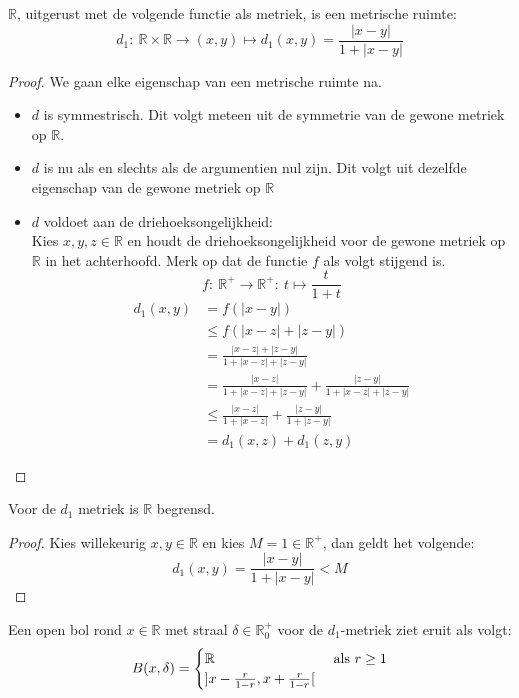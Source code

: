 \documentclass[main.tex]{subfiles}
\begin{document}
\begin{vb}
  $\mathbb{R}$, uitgerust met de volgende functie als metriek, is een metrische ruimte:
  \[ d_{1}:\ \mathbb{R}\times\mathbb{R}\rightarrow (x,y) \mapsto d_{1}(x,y)=\frac{|x-y|}{1+|x-y|} \]
  \begin{proof}
    We gaan elke eigenschap van een metrische ruimte na.
    \begin{itemize}
    \item $d$ is symmestrisch.
      Dit volgt meteen uit de symmetrie van de gewone metriek op $\mathbb{R}$.
    \item $d$ is nu als en slechts als de argumentien nul zijn.
      Dit volgt uit dezelfde eigenschap van de gewone metriek op $\mathbb{R}$
    \item $d$ voldoet aan de driehoeksongelijkheid:\\
      Kies $x,y,z \in \mathbb{R}$ en houdt de driehoeksongelijkheid voor de gewone metriek op $\mathbb{R}$ in het achterhoofd.
      Merk op dat de functie $f$ als volgt stijgend is.
      \[ f:\ \mathbb{R}^{+} \rightarrow \mathbb{R}^{+}:\ t \mapsto \frac{t}{1+t} \]
      \begin{align*}
        d_{1}(x,y)
        &= f(|x-y|)\\
        &\le f(|x-z|+|z-y|)\\
        &= \frac{|x-z|+|z-y|}{1+|x-z|+|z-y|}\\
        &= \frac{|x-z|}{1+|x-z|+|z-y|}+\frac{|z-y|}{1+|x-z|+|z-y|}\\
        &\le \frac{|x-z|}{1+|x-z|}+\frac{|z-y|}{1+|z-y|}\\
        &= d_{1}(x,z) + d_{1}(z,y)
      \end{align*}
    \end{itemize}
  \end{proof}
\end{vb}

\begin{st}
  Voor de $d_{1}$ metriek is $\mathbb{R}$ begrensd.
  \begin{proof}
    Kies willekeurig $x,y\in\mathbb{R}$ en kies $M=1\in \mathbb{R}^{+}$, dan geldt het volgende:
    \[ d_{1}(x,y) = \frac{|x-y|}{1+|x-y|} < M \]
  \end{proof}
\end{st}

\begin{vb}
  Een open bol rond $x\in \mathbb{R}$ met straal $\delta\in \mathbb{R}_{0}^{+}$ voor de $d_{1}$-metriek ziet eruit als volgt:
  \[ B(x,\delta) = 
  \begin{cases}
    \mathbb{R} &\text{ als } r \ge 1\\
    \interval[open]{x-\frac{r}{1-r}}{x+\frac{r}{1-r}}
  \end{cases}
  \]
\end{vb}
\end{document}
